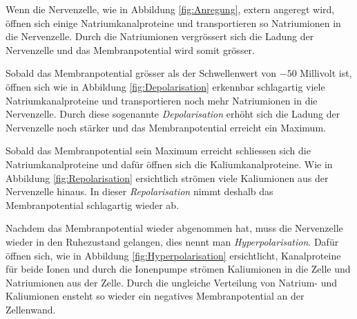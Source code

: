 Wenn die Nervenzelle, wie in Abbildung \ref{fig:Anregung}, extern angeregt wird, öffnen sich einige Natriumkanalproteine und transportieren so Natriumionen in
die Nervenzelle.
Durch die Natriumionen vergrössert sich die Ladung der Nervenzelle und das Membranpotential wird somit grösser.
%

Sobald das Membranpotential grösser als der Schwellenwert von $-50$ Millivolt ist, öffnen sich wie in Abbildung
\ref{fig:Depolarisation} erkennbar schlagartig viele
Natriumkanalproteine und transportieren noch mehr Natriumionen in die Nervenzelle.
Durch diese sogenannte \emph{Depolarisation} erhöht sich die Ladung der Nervenzelle noch stärker und das Membranpotential erreicht ein Maximum. 
%

Sobald das Membranpotential sein Maximum erreicht schliessen sich die Natriumkanalproteine und dafür öffnen sich die
Kaliumkanalproteine.
Wie in Abbildung \ref{fig:Repolarisation} ersichtlich strömen viele Kaliumionen aus der Nervenzelle hinaus.
In dieser \emph{Repolarisation} nimmt deshalb das Membranpotential schlagartig wieder ab.
%


Nachdem das Membranpotential wieder abgenommen hat, muss die Nervenzelle wieder in den Ruhezustand gelangen, dies nennt
man \emph{Hyperpolarisation}.
%
Dafür öffnen sich, wie in Abbildung \ref{fig:Hyperpolarisation} ersichtlicht, Kanalproteine für beide Ionen und durch die
Ionenpumpe strömen Kaliumionen in die Zelle und Natriumionen aus der Zelle.
Durch die ungleiche Verteilung von Natrium- und Kaliumionen ensteht so wieder ein negatives Membranpotential an der Zellenwand.


